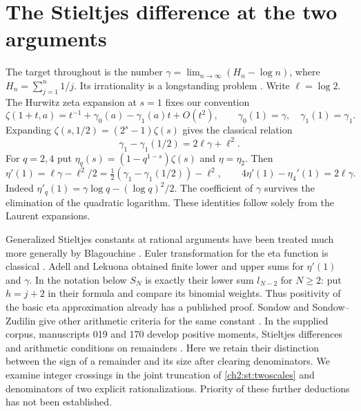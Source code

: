 \documentclass[11pt,a4paper,oneside,openany]{report}
\theoremstyle{remark}\newtheorem{remark}[theorem]{Remark}
\numberwithin{equation}{section}
\begin{document}
\section{The Stieltjes difference at the two arguments}
The target throughout is the number $\gamma=\lim_{n\to\infty}(H_n-\log n)$, where $H_n=\sum_{j=1}^n1/j$. Its irrationality is a longstanding problem \cite{lagarias,status}. Write $\ell=\log 2$. The Hurwitz zeta expansion at $s=1$ fixes our convention
\[
 \zeta(1+t,a)=t^{-1}+\gamma_0(a)-\gamma_1(a)t+O(t^2),\qquad
 \gamma_0(1)=\gamma,\quad\gamma_1(1)=\gamma_1 .
\]
Expanding $\zeta(s,1/2)=(2^s-1)\zeta(s)$ gives the classical relation
\begin{equation}
 \gamma_1-\gamma_1(1/2)=2\ell\gamma+\ell^2.\label{ch2:st:half}
\end{equation}
For $q=2,4$ put $\eta_q(s)=(1-q^{1-s})\zeta(s)$ and $\eta=\eta_2$. Then
\begin{equation}
 \eta'(1)=\ell\gamma-\ell^2/2
 =\tfrac12(\gamma_1-\gamma_1(1/2))-\ell^2,
 \qquad 4\eta'(1)-\eta_4'(1)=2\ell\gamma .\label{ch2:st:twoscales}
\end{equation}
Indeed $\eta'_q(1)=\gamma\log q-(\log q)^2/2$. The coefficient of $\gamma$ survives the elimination of the quadratic logarithm. These identities follow solely from the Laurent expansions.

Generalized Stieltjes constants at rational arguments have been treated much more generally by Blagouchine \cite{blag}. Euler transformation for the eta function is classical \cite{euler}. Adell and Lekuona \cite[Thm.~2.1]{adell} obtained finite lower and upper sums for $\eta'(1)$ and $\gamma$. In the notation below $S_N$ is exactly their lower sum $l_{N-2}$ for $N\ge2$: put $h=j+2$ in their formula and compare its binomial weights. Thus positivity of the basic eta approximation already has a published proof. Sondow and Sondow--Zudilin give other arithmetic criteria for the same constant \cite{sondow,sz}. In the supplied corpus, manuscripts 019 and 170 develop positive moments, Stieltjes differences and arithmetic conditions on remainders \cite{corpus}. Here we retain their distinction between the sign of a remainder and its size after clearing denominators. We examine integer crossings in the joint truncation of \eqref{ch2:st:twoscales} and denominators of two explicit rationalizations. Priority of these further deductions has not been established.
\end{document}
